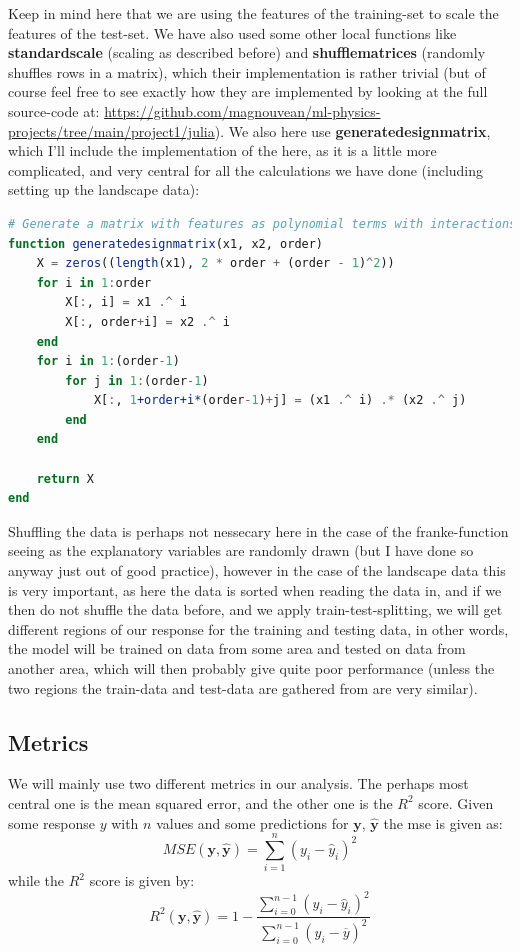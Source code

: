 \documentclass{article}
\begin{document}
Keep in mind here that we are using the features of the training-set to scale
the features of the test-set. We have also used some other local functions like
\textbf{standardscale} (scaling as described before) and
\textbf{shufflematrices} (randomly shuffles rows in a matrix), which their
implementation is rather trivial (but of course feel free to see exactly how
they are implemented by looking at the full source-code at:
\url{https://github.com/magnouvean/ml-physics-projects/tree/main/project1/julia}).
We also here use \textbf{generatedesignmatrix}, which I'll include the
implementation of the here, as it is a little more complicated, and very central
for all the calculations we have done (including setting up the landscape data):
\begin{lstlisting}[language=julia]
# Generate a matrix with features as polynomial terms with interactions
function generatedesignmatrix(x1, x2, order)
    X = zeros((length(x1), 2 * order + (order - 1)^2))
    for i in 1:order
        X[:, i] = x1 .^ i
        X[:, order+i] = x2 .^ i
    end
    for i in 1:(order-1)
        for j in 1:(order-1)
            X[:, 1+order+i*(order-1)+j] = (x1 .^ i) .* (x2 .^ j)
        end
    end

    return X
end
\end{lstlisting}

Shuffling the data is perhaps not nessecary here in the case of the
franke-function seeing as the explanatory variables are randomly drawn (but I
have done so anyway just out of good practice), however in the case of the
landscape data this is very important, as here the data is sorted when reading
the data in, and if we then do not shuffle the data before, and we apply
train-test-splitting, we will get different regions of our response for the
training and testing data, in other words, the model will be trained on data
from some area and tested on data from another area, which will then probably
give quite poor performance (unless the two regions the train-data and test-data
are gathered from are very similar).

\subsection{Metrics}
We will mainly use two different metrics in our analysis. The perhaps most
central one is the mean squared error, and the other one is the $R^2$ score.
Given some response $y$ with $n$ values and some predictions for $\mathbf{y}$,
$\hat{\mathbf{y}}$ the mse is given as: \cite{week34notes}
$$MSE(\mathbf{y}, \hat{\mathbf{y}}) = \sum_{i=1}^n (y_i - \hat{y}_i)^2$$
while the $R^2$ score is given by: \cite{week34notes}
$$R^2(\mathbf{y}, \hat{\mathbf{y}}) = 1 - \frac{\sum_{i=0}^{n-1} (y_i - \hat{y}_i)^2}{\sum_{i=0}^{n-1}(y_i - \overline{y})^2}$$
\end{document}
